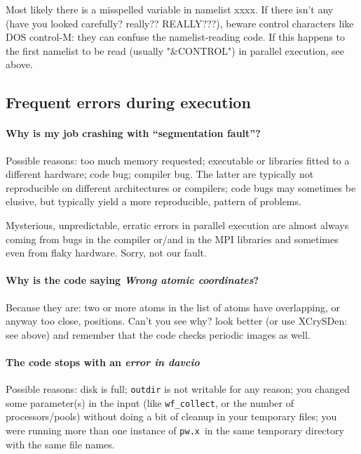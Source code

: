 \documentclass[12pt,a4paper]{article}
\def\pwx{\texttt{pw.x}}
\begin{document}
Most likely there is a misspelled variable in namelist xxxx.
If there isn't any (have you looked carefully? really?? REALLY???), 
beware control characters like DOS control-M: they can confuse
the namelist-reading code. If this happens to the first namelist 
to be read (usually "\&CONTROL") in parallel execution, see above.



\subsection{Frequent errors during execution}

\paragraph{Why is my job crashing with ``segmentation fault''?}

Possible reasons: too much memory requested; executable or libraries
fitted to a different hardware; code bug; compiler bug. The latter are
typically not reproducible on different architectures or compilers; 
code bugs may sometimes be elusive, but typically yield a more
reproducible, pattern of problems.

Mysterious, unpredictable, erratic errors in parallel execution are
almost always coming from bugs in the compiler or/and in the MPI 
libraries and sometimes even from flaky hardware. Sorry, not our fault.

\paragraph{Why is the code saying {\em Wrong atomic coordinates}?}

Because they are: two or more atoms in the list of atoms have
overlapping, or anyway too close, positions. Can't you see why? look better
(or use XCrySDen: see above) and remember that the code checks periodic
images as well. 

\paragraph{The code stops with an {\em error in davcio}}

Possible reasons: disk is full; \texttt{outdir} is not writable for
any reason; you changed some parameter(s) in the input (like 
\texttt{wf\_collect}, or the number of processors/pools) without 
doing a bit of cleanup in your temporary files; you were running 
more than one instance of \pwx\ in the same temporary
directory with the same file names. 
\end{document}
